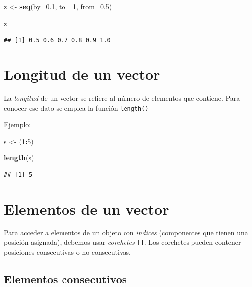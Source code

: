 \documentclass[
]{book}
\newenvironment{Shaded}{\begin{snugshade}}{\end{snugshade}}
\newcommand{\AttributeTok}[1]{\textcolor[rgb]{0.13,0.29,0.53}{#1}}
\newcommand{\DecValTok}[1]{\textcolor[rgb]{0.00,0.00,0.81}{#1}}
\newcommand{\FloatTok}[1]{\textcolor[rgb]{0.00,0.00,0.81}{#1}}
\newcommand{\FunctionTok}[1]{\textcolor[rgb]{0.13,0.29,0.53}{\textbf{#1}}}
\newcommand{\NormalTok}[1]{#1}
\newcommand{\OtherTok}[1]{\textcolor[rgb]{0.56,0.35,0.01}{#1}}
\newcommand{\SpecialCharTok}[1]{\textcolor[rgb]{0.81,0.36,0.00}{\textbf{#1}}}
\begin{document}
\begin{Shaded}
\begin{Highlighting}[]
\NormalTok{z }\OtherTok{\textless{}{-}} \FunctionTok{seq}\NormalTok{(}\AttributeTok{by=}\FloatTok{0.1}\NormalTok{, }\AttributeTok{to =}\DecValTok{1}\NormalTok{, }\AttributeTok{from=}\FloatTok{0.5}\NormalTok{)}

\NormalTok{z}
\end{Highlighting}
\end{Shaded}

\begin{verbatim}
## [1] 0.5 0.6 0.7 0.8 0.9 1.0
\end{verbatim}

\hypertarget{longitud-de-un-vector}{%
\section{Longitud de un vector}\label{longitud-de-un-vector}}

La \emph{longitud} de un vector se refiere al número de elementos que contiene. Para conocer ese dato se emplea la función \texttt{length()}

Ejemplo:

\begin{Shaded}
\begin{Highlighting}[]
\NormalTok{s }\OtherTok{\textless{}{-}}\NormalTok{ (}\DecValTok{1}\SpecialCharTok{:}\DecValTok{5}\NormalTok{)}

\FunctionTok{length}\NormalTok{(s)}
\end{Highlighting}
\end{Shaded}

\begin{verbatim}
## [1] 5
\end{verbatim}

\hypertarget{elementos-de-un-vector}{%
\section{Elementos de un vector}\label{elementos-de-un-vector}}

Para acceder a elementos de un objeto con \emph{indices} (componentes que tienen una posición asignada), debemos usar \emph{corchetes} \texttt{{[}{]}}. Los corchetes pueden contener posiciones consecutivas o no consecutivas.

\hypertarget{elementos-consecutivos}{%
\subsection{Elementos consecutivos}\label{elementos-consecutivos}}
\end{document}
